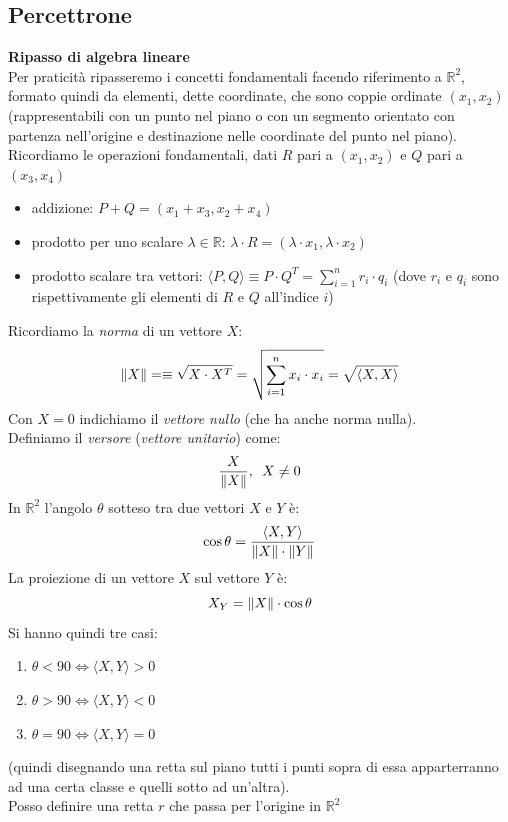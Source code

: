 \documentclass[a4paper,12pt, oneside]{book}
\begin{document}
\subsection{Percettrone}
\begin{shaded}
  \textbf{Ripasso di algebra lineare}\\
  Per praticità ripasseremo i concetti fondamentali facendo riferimento a
  $\mathbb{R}^2$, formato quindi da elementi, dette coordinate, che sono coppie
  ordinate $(x_1,x_2)$ (rappresentabili con un punto nel piano o con un segmento
  orientato con partenza nell'origine e destinazione nelle coordinate del punto
  nel piano).\\
  Ricordiamo le operazioni fondamentali, dati $R$ pari a $(x_1,x_2)$ e $Q$ pari
  a $(x_3,x_4)$ 
  \begin{itemize}
    \item addizione: $P+Q=(x_1+x_3, x_2+x_4)$
    \item prodotto per uno scalare $\lambda\in\mathbb{R}$: $\lambda\cdot
    R=(\lambda\cdot x_1,\lambda\cdot x_2)$
    \item prodotto scalare tra vettori: $\langle P,Q\rangle\equiv P\cdot Q^T =
    \sum_{i=1}^n r_i\cdot q_i$ 
    (dove $r_i$ e $q_i$ sono rispettivamente gli elementi di $R$ e $Q$
    all'indice $i$)
  \end{itemize}
  Ricordiamo la \textit{norma} di un vettore $X$:
  \[\norm{X}=\equiv\sqrt{X\cdot X^T}=\sqrt{\sum_{i=1}^n x_i\cdot
      x_i}=\sqrt{\langle X,X\rangle}\] 
  Con $X=0$ indichiamo il \textit{vettore nullo} (che ha anche norma nulla).\\
  Definiamo il \textit{versore} (\textit{vettore unitario}) come:
  \[\frac{X}{\norm{X}},\,\,\,X\neq 0\]
  In $\mathbb{R}^2$ l'angolo $\theta$ sotteso tra due vettori $X$ e $Y$ è:
  \[\cos\theta=\frac{\langle X,Y\rangle}{\norm{X}\cdot \norm{Y}}\]
  La proiezione di un vettore $X$ sul vettore $Y$ è:
  \[X_Y=\norm{X}\cdot \cos\theta\]
  Si hanno quindi tre casi:
  \begin{enumerate}
    \item $\theta < 90 \iff \langle X,Y\rangle >0$
    \item $\theta > 90 \iff \langle X,Y\rangle <0$
    \item $\theta = 90 \iff \langle X,Y\rangle =0$
  \end{enumerate}
  (quindi disegnando una retta sul piano tutti i punti sopra di essa
  apparterranno ad una certa classe e quelli sotto ad un'altra).\\
  Posso definire una retta $r$ che passa per l'origine in  $\mathbb{R}^2$

\end{shaded}
\end{document}
